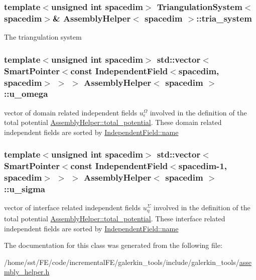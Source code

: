 \subsubsection[{\texorpdfstring{tria\+\_\+system}{tria_system}}]{\setlength{\rightskip}{0pt plus 5cm}template$<$unsigned int spacedim$>$ {\bf Triangulation\+System}$<$spacedim$>$\& {\bf Assembly\+Helper}$<$ spacedim $>$\+::tria\+\_\+system\hspace{0.3cm}{\ttfamily [private]}}\hypertarget{class_assembly_helper_add08a8a7bb9c9325fcc7d92bfce525d4}{}\label{class_assembly_helper_add08a8a7bb9c9325fcc7d92bfce525d4}
The triangulation system 
\subsubsection[{\texorpdfstring{u\+\_\+omega}{u_omega}}]{\setlength{\rightskip}{0pt plus 5cm}template$<$unsigned int spacedim$>$ std\+::vector$<${\bf Smart\+Pointer}$<$const {\bf Independent\+Field}$<$spacedim, spacedim$>$ $>$ $>$ {\bf Assembly\+Helper}$<$ spacedim $>$\+::u\+\_\+omega\hspace{0.3cm}{\ttfamily [private]}}\hypertarget{class_assembly_helper_a1952a054a839a7a683ca108013e7d976}{}\label{class_assembly_helper_a1952a054a839a7a683ca108013e7d976}
vector of domain related independent fields $u^\Omega_\epsilon$ involved in the definition of the total potential \hyperlink{class_assembly_helper_a748eed9d73b7437a4bf2dcd73108790b}{Assembly\+Helper\+::total\+\_\+potential}. These domain related independent fields are sorted by \hyperlink{class_independent_field_ae05f8565e4ce1a70b5b833555dc084b5}{Independent\+Field\+::name} 
\subsubsection[{\texorpdfstring{u\+\_\+sigma}{u_sigma}}]{\setlength{\rightskip}{0pt plus 5cm}template$<$unsigned int spacedim$>$ std\+::vector$<${\bf Smart\+Pointer}$<$const {\bf Independent\+Field}$<$spacedim-\/1, spacedim$>$ $>$ $>$ {\bf Assembly\+Helper}$<$ spacedim $>$\+::u\+\_\+sigma\hspace{0.3cm}{\ttfamily [private]}}\hypertarget{class_assembly_helper_a696fe649b3503561235aa1ccbf2ddeef}{}\label{class_assembly_helper_a696fe649b3503561235aa1ccbf2ddeef}
vector of interface related independent fields $u^\Sigma_\eta$ involved in the definition of the total potential \hyperlink{class_assembly_helper_a748eed9d73b7437a4bf2dcd73108790b}{Assembly\+Helper\+::total\+\_\+potential}. These interface related independent fields are sorted by \hyperlink{class_independent_field_ae05f8565e4ce1a70b5b833555dc084b5}{Independent\+Field\+::name} 

The documentation for this class was generated from the following file\+:\begin{DoxyCompactItemize}
\item 
/home/sst/\+F\+E/code/incremental\+F\+E/galerkin\+\_\+tools/include/galerkin\+\_\+tools/\hyperlink{assembly__helper_8h}{assembly\+\_\+helper.\+h}\end{DoxyCompactItemize}
